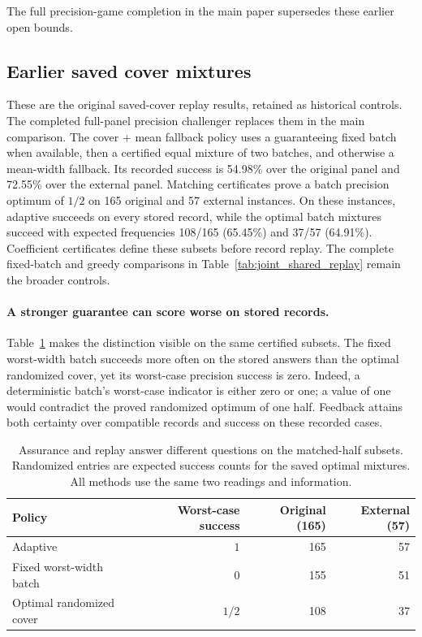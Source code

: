 The full precision-game completion in the main paper supersedes these earlier open bounds.
\subsection{Earlier saved cover mixtures}
These are the original saved-cover replay results, retained as historical controls. The completed full-panel precision challenger replaces them in the main comparison.
The cover + mean fallback policy uses a guaranteeing fixed batch when
available, then a certified equal mixture of two batches, and otherwise a
mean-width fallback.
Its recorded success is 54.98\% over the original panel and 72.55\% over the
external panel.
Matching certificates prove a batch precision optimum of
$1/2$ on 165 original and 57 external instances. On these instances, adaptive
succeeds on every stored record, while the optimal batch mixtures succeed
with expected frequencies 108/165 (65.45\%) and 37/57 (64.91\%). Coefficient
certificates define these subsets before record replay. The complete fixed-batch and greedy
comparisons in Table~\ref{tab:joint_shared_replay} remain the broader controls.

\paragraph{A stronger guarantee can score worse on stored records.}
Table~\ref{tab:guarantee-recorded-tradeoff} makes the distinction visible on
the same certified subsets. The fixed worst-width batch succeeds more often
on the stored answers than the optimal randomized cover, yet its worst-case
precision success is zero. Indeed, a deterministic batch's worst-case
indicator is either zero or one; a value of one would contradict the
proved randomized optimum of one half. Feedback attains both certainty
over compatible records and success on these recorded cases.

\begin{table}[htbp]\centering\small
\caption{Assurance and replay answer different questions on the matched-half
subsets. Randomized entries are expected success counts for the saved
optimal mixtures. All methods use the same two readings and information.}
\label{tab:guarantee-recorded-tradeoff}
\begin{tabular}{lrrr}\toprule
Policy & Worst-case success & Original (165) & External (57)\\\midrule
Adaptive & $1$ & 165 & 57\\
Fixed worst-width batch & $0$ & 155 & 51\\
Optimal randomized cover & $1/2$ & 108 & 37\\
\bottomrule\end{tabular}\end{table}

